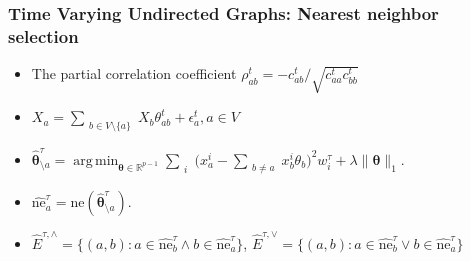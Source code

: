 \documentclass{beamer}
\newcommand{\boldtheta}{{\boldsymbol{\theta}}}
\DeclareMathOperator*{\argmin}{arg\,min}
\begin{document}
\begin{frame}

\frametitle{Time Varying Undirected Graphs: Nearest neighbor selection}

\begin{itemize}
\item The partial correlation coefficient $\rho_{ab}^t = - c_{ab}^t / \sqrt{c_{aa}^t c_{bb}^t} $
\item $X_a = \sum_{\substack{b \in V\setminus \{a\} }} X_b \theta_{ab}^t + \epsilon_a^t, a \in V $
\item $\hat{\boldtheta}_{\setminus a }^{\tau} = \argmin_{\boldtheta \in \mathbb{R}^{p-1}} \sum_{\substack{i}} \Big( x_a^i - \sum_{\substack{b \neq a}} x_b^i \theta_b \Big)^2 w_i^{\tau} + \lambda \| \boldtheta \|_1 $.
\item $\hat{\text{ne}}_a^{\tau} = \text{ne}(\hat{\boldtheta}_{\setminus a }^{\tau})$.
\item $\hat{E}^{\tau, \wedge} = \{ (a, b): a \in \hat{\text{ne}}_b^{\tau} \wedge b \in \hat{\text{ne}}_a^{\tau} \}$, $\hat{E}^{\tau, \vee} = \{ (a, b): a \in \hat{\text{ne}}_b^{\tau} \vee b \in \hat{\text{ne}}_a^{\tau} \}$

\end{itemize}


\end{frame}
\end{document}
